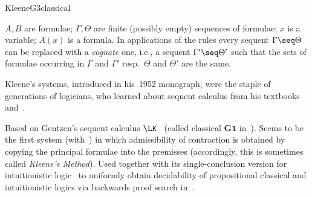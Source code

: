 \begin{entry}{KleeneG3classical}
\begin{clarifications}
  $A,B$ are formulae; $\Gamma,\Theta$ are finite (possibly empty)
  sequences of formulae; $x$ is a variable; $A(x)$ is a formula. In
  applications of the rules every sequent $\Gamma \seq \Theta$ can be
  replaced with a \emph{cognate} one, i.e., a sequent
  $\Gamma' \seq \Theta'$ such that the sets of formulae occurring in
  $\Gamma$ and $\Gamma'$ resp.\ $\Theta$ and $\Theta'$ are the same.
\end{clarifications}

\begin{history}
  Kleene's systems, introduced in his~1952 monograph, were the staple of
  generations of logicians, who learned about sequent calculus from
  his textbooks~\cite{Kleene:1952} and~\cite{Kleene:1967}.
\end{history}

\begin{technicalities}
  Based on Gentzen's sequent calculus $\LK$~ (called
  classical $\mathbf{G1}$ in~\cite{Kleene:1952}). Seems to be the
  first system (with~) in which
  admissibility of contraction is obtained by copying the principal
  formulae into the premisses (accordingly, this is sometimes called
  \emph{Kleene's Method}). Used together with its single-conclusion
  version for intuitionistic logic~ to
  uniformly obtain decidability of propositional classical and
  intuitionistic logics via backwards proof search
  in~\cite{Kleene:1952}.
\end{technicalities}


\nocite{Kleene:1952}


\end{entry}
